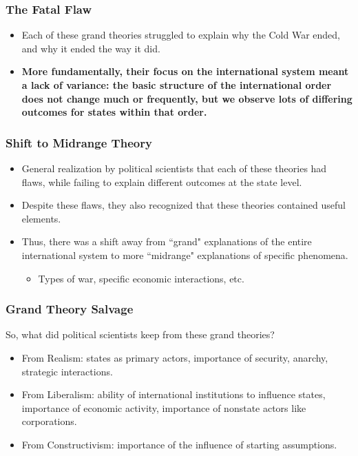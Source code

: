 \documentclass{beamer}
\begin{document}
\begin{frame} 
	\frametitle{\LARGE{The Fatal Flaw}}
	\begin{itemize}
		\item Each of these grand theories struggled to explain why the Cold War ended, and why it ended the way it did. \pause
		\item \textbf{More fundamentally, their focus on the international system meant a lack of variance: the basic structure of the international order does not change much or frequently, but we observe lots of differing outcomes for states within that order.}
	\end{itemize}
\end{frame}
    
\begin{frame} 
	\frametitle{\LARGE{Shift to Midrange Theory}}
	\begin{itemize}
		\item General realization by political scientists that each of these theories had flaws, while failing to explain different outcomes at the state level. \pause
		\item Despite these flaws, they also recognized that these theories contained useful elements. \pause
		\item Thus, there was a shift away from ``grand" explanations of the entire international system to more ``midrange" explanations of specific phenomena. 
		\begin{itemize}
			\item Types of war, specific economic interactions, etc.
		\end{itemize}
	\end{itemize}
\end{frame}

\begin{frame} 
	\frametitle{\LARGE{Grand Theory Salvage}}
So, what did political scientists keep from these grand theories?
	\begin{itemize}
		\item From Realism: states as primary actors, importance of security, anarchy, strategic interactions. \pause
		\item From Liberalism: ability of international institutions to influence states, importance of economic activity, importance of nonstate actors like corporations. \pause
		\item From Constructivism: importance of the influence of starting assumptions.		
	\end{itemize}
\end{frame}
\end{document}
